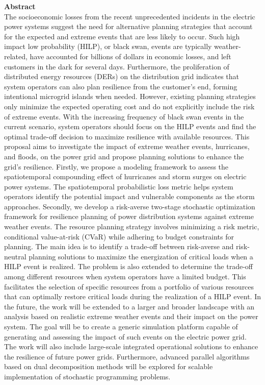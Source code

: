 \documentclass[hidelinks, 12pt]{article}
\begin{document}
\textbf{\centering \large Abstract \\}
The socioeconomic losses from the recent unprecedented incidents in the electric power systems suggest the need for alternative planning strategies that account for the expected and extreme events that are less likely to occur. Such high impact low probability (HILP), or black swan, events are typically weather-related, have accounted for billions of dollars in economic losses, and left customers in the dark for several days. Furthermore, the proliferation of distributed energy resources (DERs) on the distribution grid indicates that system operators can also plan resilience from the customer's end, forming intentional microgrid islands when needed. However, existing planning strategies only minimize the expected operating cost and do not explicitly include the risk of extreme events. With the increasing frequency of black swan events in the current scenario, system operators should focus on the HILP events and find the optimal trade-off decision to maximize resilience with available resources. This proposal aims to investigate the impact of extreme weather events, hurricanes, and floods, on the power grid and propose planning solutions to enhance the grid's resilience. Firstly, we propose a modeling framework to assess the spatiotemporal compounding effect of hurricanes and storm surges on electric power systems. The spatiotemporal probabilistic loss metric helps system operators identify the potential impact and vulnerable components as the storm approaches. Secondly, we develop a risk-averse two-stage stochastic optimization framework for resilience planning of power distribution systems against extreme weather events. The resource planning strategy involves minimizing a risk metric, conditional value-at-risk (CVaR) while adhering to budget constraints for planning. The main idea is to identify a trade-off between risk-averse and risk-neutral planning solutions to maximize the energization of critical loads when a HILP event is realized. The problem is also extended to determine the trade-off among different resources when system operators have a limited budget. This facilitates the selection of specific resources from a portfolio of various resources that can optimally restore critical loads during the realization of a HILP event. In the future, the work will be extended to a larger and broader landscape with an analysis based on realistic extreme weather events and their impact on the power system. The goal will be to create a generic simulation platform capable of generating and assessing the impact of such events on the electric power grid. The work will also include large-scale integrated operational solutions to enhance the resilience of future power grids. Furthermore, advanced parallel algorithms based on dual decomposition methods will be explored for scalable implementation of stochastic programming problems.
\newpage
\tableofcontents
\newpage
\end{document}
